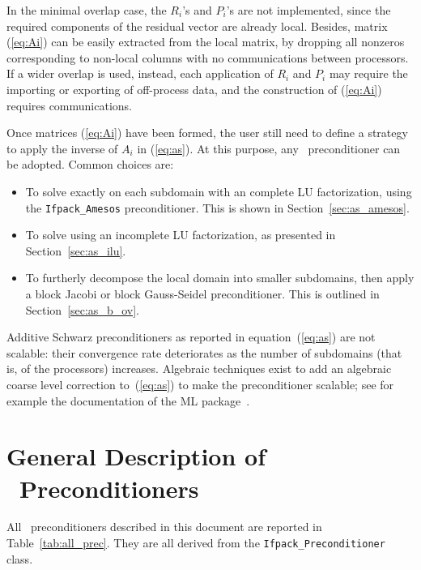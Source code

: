 In the minimal overlap case, the $R_i$'s and $P_i$'s are not implemented, since the
required components of the residual vector are already local. Besides, matrix
(\ref{eq:Ai}) can be easily extracted from the local matrix, by dropping all
nonzeros corresponding to non-local columns with no 
communications between processors. If a wider overlap
is used, instead, each application of $R_i$ and $P_i$ may require the
importing or exporting of
off-process data, and the construction of (\ref{eq:Ai}) requires
communications.

\smallskip

Once matrices (\ref{eq:Ai}) have been formed, the user still need to define a
strategy to apply the inverse of $A_i$ in (\ref{eq:as}). At this purpose,
any \ifpack\ preconditioner can be adopted. Common choices are:
\begin{itemize}
\item To solve exactly on each subdomain with an complete LU factorization, using the \verb!Ifpack_Amesos!
preconditioner. This is shown in Section~\ref{sec:as_amesos}.
\item To solve using an incomplete LU factorization, as presented in
Section~\ref{sec:as_ilu}.
\item To furtherly decompose the local domain into smaller subdomains,
  then apply a block Jacobi or block Gauss-Seidel preconditioner. This is
  outlined in Section~\ref{sec:as_b_ov}.
\end{itemize}

\begin{remark}
Additive Schwarz preconditioners as reported in equation~(\ref{eq:as}) 
are not scalable: their convergence rate
deteriorates as the number of subdomains (that is, of the processors)
increases. Algebraic techniques
exist to add an algebraic coarse level correction to~(\ref{eq:as}) to make the
preconditioner scalable; 
see for example the documentation of the ML
package~\cite{ml-guide}.
\end{remark}

\section{General Description of \ifpack\ Preconditioners}
\label{sec:prec}

All \ifpack\ preconditioners described in this document
are reported in Table~\ref{tab:all_prec}. They are all derived from the 
\verb!Ifpack_Preconditioner!
class.

